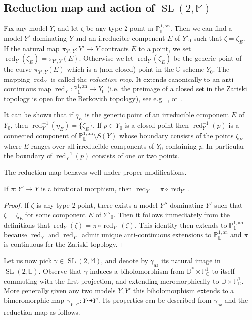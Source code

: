 \documentclass[AHL,Unicode,longabstracts]{cedram}
\DeclareMathOperator{\red}{red}
\DeclareMathOperator{\SL}{SL}
\newcommand{\cc}{\mathbb{C}}
\newcommand{\dD}{\mathbb{D}}
\newcommand{\mm}{\mathbb{M}}
\newcommand{\an}{\mathrm{an}}
\newcommand{\PP}{\mathbb{P}}
\newcommand{\berkl}{\mathbb P^{1,\an}_{\Laurent}}
\newcommand{\Laurent}{\mathbb{L}}
\newcommand{\na}{\mathsf{na}}
\begin{document}
\subsection{Reduction map and action of \texorpdfstring{$ \SL(2,\mm)$}{SL(2, mm)}}\label{subs:reduction}

Fix any model $Y$, and let $\zeta$ be any type 2 point in $\PP^{1,\an}_{\Laurent}$. Then we can find a model $Y'$ dominating $Y$ and an irreducible component $E$ of $Y'_0$ such that $\zeta = \zeta_E$. If the natural map $\pi_{Y',Y}: Y' \to Y$ contracts $E$ to a point, we set $\red_Y(\zeta_E) = \pi_{Y',Y}(E)$. Otherwise we let $\red_Y(\zeta_E)$ be the generic point of the curve $\pi_{Y',Y}(E)$ which is a (non-closed) point in the $\cc$-scheme $Y_0$. The mapping $\red_Y$ is called the \emph{reduction map}. It extends canonically to an anti-continuous map $\red_Y: \PP^{1,\an}_{\Laurent}\to Y_0$ (i.e. the preimage of a closed set in the Zariski topology is open for the Berkovich topology), see e.g.~\cite[\S 5.2.4]{temkin}, or~\cite[\S 4.2]{demarco-faber-2}.

It can be shown that if $\eta_E$ is the generic point of an irreducible component $E$ of $Y_0$, then $\red_Y^{-1}(\eta_E) = \{ \zeta_E\}$. If $p\in Y_0$ is a closed point then $\red_Y^{-1}(p)$ is a connected component of $\berkl\setminus {S}(Y)$ whose boundary consists of the points $\zeta_E$ where $E$ ranges over all irreducible components of $Y_0$ containing $p$. In particular the boundary of $\red_Y^{-1}(p)$ consists of one or two points.

The reduction map behaves well under proper modifications.

\begin{lemm}\label{lem:reduction modification}
If $\pi: Y'\to Y$ is a birational morphism, then $\red_Y = \pi\circ \red_{Y'}$.
\end{lemm}

\begin{proof}
If $\zeta$ is any type 2 point, there exists a model $Y''$ dominating $Y'$ such that $\zeta = \zeta_E$ for some component $E$ of $Y''_0$. Then it follows immediately from the definitions that $\red_Y (\zeta)= \pi\circ \red_{Y'}(\zeta)$. This identity then extends to $\berkl$ because $\red_Y$ and $\red_{Y'}$ admit unique anti-continuous extensions to $\berkl$ and $\pi$ is continuous for the Zariski topology.
\end{proof}

Let us now pick $\gamma \in \SL(2, \mm)$, and denote by $\gamma_\na$ its natural image in $\SL(2, \Laurent)$. Observe that $\gamma$ induces a biholomorphism from $\dD^*\times \PP^1_\cc$ to itself commuting with the first projection, and extending meromorphically to $\dD \times \PP^1_\cc$. More generally given any two models $Y,Y'$ this biholomorphism extends to a bimeromorphic map $\gamma_{Y,Y'}: Y \dashrightarrow Y'$. Its properties can be described from $\gamma_\na$ and the reduction map as follows.
\end{document}
